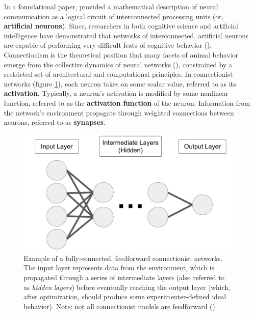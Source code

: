 \documentclass[12pt]{article}
\let\oldcite=\cite
\let\oldtextcite=\textcite
\renewcommand{\cite}[1]{\textcolor[rgb]{0, .121, .388}{\oldcite{#1}}}
\renewcommand{\textcite}[1]{\textcolor[rgb]{0, .121, .388}{\oldtextcite{#1}}}
\begin{document}
In a foundational paper, \textcite{mcculloch1943logical} provided a mathematical description of neural communication as a logical circuit of interconnected processing units (or, \textbf{artificial neurons}). Since, researchers in both cognitive science and artificial intelligence have demonstrated that networks of interconnected, artificial neurons are capable of performing very difficult feats of cognitive behavior (\cite{schmidhuber2015deep}). Connectionism is the theoretical position that many facets of animal behavior emerge from the collective dynamics of neural networks (\cite{rumelhart1986general}), constrained by a restricted set of architectural and computational principles. In connectionist networks (figure \ref{fig:feedforward}), each neuron takes on some scalar value, referred to as its \textbf{activation}. Typically, a neuron's activation is modified by some nonlinear function, referred to as the \textbf{activation function} of the neuron. Information from the network's environment propagate through weighted connections between neurons, referred to as \textbf{synapses}. 

\begin{figure}[!h]
    \centering
    \includegraphics[scale=.4]{figures/feedforward.png}
    \caption{Example of a fully-connected, feedforward connectionist networks. The input layer represents data from the environment, which is propagated through a series of intermediate layers (also referred to as \emph{hidden layers}) before eventually reaching the output layer (which, after optimization, should produce some experimenter-defined ideal behavior). Note: not all connectionist models are feedforward (\cite{hinton2007boltzmann,kohonen2007kohonen,hopfield2007hopfield}).}
    \label{fig:feedforward}
\end{figure} 
\end{document}
